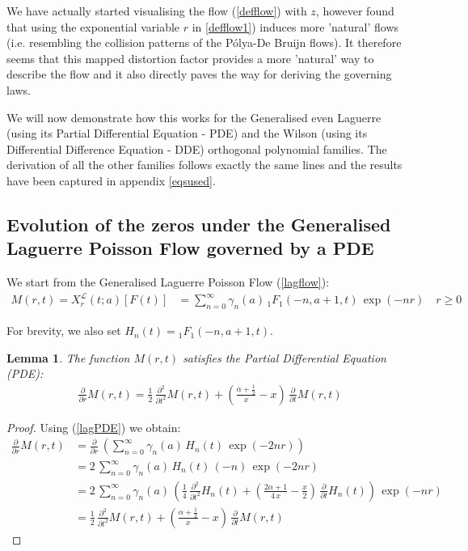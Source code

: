 \documentclass[a4paper,11pt,twoside]{amsart}
\newtheorem{lemma}[theorem]{Lemma}
\newcommand{\verifiedeq}{=}
\newcommand{\defeq}{=}
\newcommand{\verifiedeq}{\stackrel{\checkmark}{=}}
\newcommand{\defeq}{\stackrel{\scriptscriptstyle \textnormal{def}}{=}}
\begin{document}
We have actually started visualising the flow (\ref{defflow}) with $z$, however found that using the exponential variable $r$ in \ref{defflow1}) induces more 'natural' flows (i.e. resembling the collision patterns of the Pólya-De Bruijn flows). It therefore seems that this mapped distortion factor provides a more 'natural' way to describe the flow and it also directly paves the way for deriving the governing laws.    

We will now demonstrate how this works for the Generalised even Laguerre (using its Partial Differential Equation - PDE) and the Wilson (using its Differential Difference Equation - DDE) orthogonal polynomial families. The derivation of all the other families follows exactly the same lines and the results have been captured in appendix \ref{eqsused}.

\subsection{Evolution of the zeros under the Generalised Laguerre Poisson Flow governed by a PDE} \label{Laguerrelawspoissonflow}
We start from the Generalised Laguerre Poisson Flow (\ref{lagflow}):
\begin{align}
  M(r,t)=  X^{\mathcal{L}}_r(t;a)\left[F(t)\right] &\verifiedeq \sum_{n=0}^\infty \gamma_n(a)\,{}_1F_1\left(-n, a+1,t\right)\,\exp(-nr)\quad r \ge 0
\end{align} 

For brevity, we also set $H_n(t) \defeq {}_1F_1\left(-n, a+1,t\right)$. 

\begin{lemma}\label{proofBes1} The function $M(r,t)$ satisfies the Partial Differential Equation (PDE): 
\begin{align}
 \frac{\partial}{\partial r}M(r,t) \verifiedeq \frac12\,\frac{\partial^2}{\partial t^2}M(r,t) + \left(\frac{\alpha+\frac12}{x}-x\right)\,\frac{\partial }{\partial t}M(r,t)
\end{align}
\end{lemma}

\begin{proof}
Using (\ref{lagPDE}) we obtain:
\begin{align}
 \frac{\partial}{\partial r}M(r,t) &\verifiedeq  \frac{\partial}{\partial r}\,\left(\sum_{n=0}^\infty \gamma_n(a)\,H_n(t)\,\exp(-2nr)\right) \\
 &\verifiedeq 2\,\sum_{n=0}^\infty \gamma_n(a)\,H_n(t)\,\left(-n\right)\,\exp(-2nr) \\
 &\verifiedeq 2\,\sum_{n=0}^\infty \gamma_n(a)\,\left(\frac14\,\frac{\partial^2}{\partial t^2}H_n(t)+ \left(\frac{2\alpha+1}{4\,x}-\frac{x}{2}\right)\, \frac{\partial}{\partial t}H_n(t)  \right)\, \exp(-nr)\\
 &\verifiedeq \frac12\,\frac{\partial^2}{\partial t^2}M(r,t) + \left(\frac{\alpha+\frac12}{x}-x\right)\,\frac{\partial }{\partial t}M(r,t)
\end{align}
\end{proof}
\end{document}
